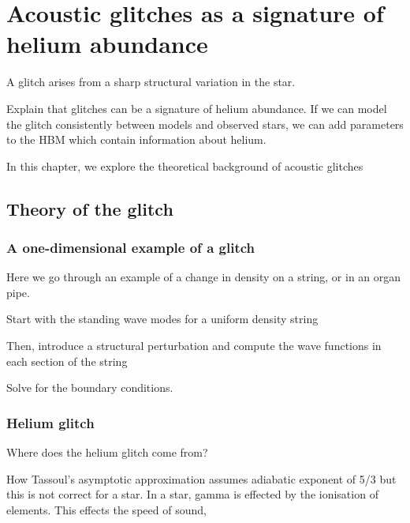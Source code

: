 %
%
%
%
%
\chapter[Acoustic glitches]{Acoustic glitches as a signature of helium abundance}\label{chap:glitch}

A glitch arises from a sharp structural variation in the star.

Explain that glitches can be a signature of helium abundance. If we can model the glitch consistently between models and observed stars, we can add parameters to the HBM which contain information about helium.

In this chapter, we explore the theoretical background of acoustic glitches

\section{Theory of the glitch}

\subsection[1D example]{A one-dimensional example of a glitch}

Here we go through an example of a change in density on a string, or in an organ pipe.

Start with the standing wave modes for a uniform density string

Then, introduce a structural perturbation and compute the wave functions in each section of the string

Solve for the boundary conditions.



\subsection{Helium glitch}\label{sec:helium-glitch}

Where does the helium glitch come from?

How Tassoul's asymptotic approximation assumes adiabatic exponent of 5/3 but this is not correct for a star. In a star, gamma is effected by the ionisation of elements. This effects the speed of sound,


